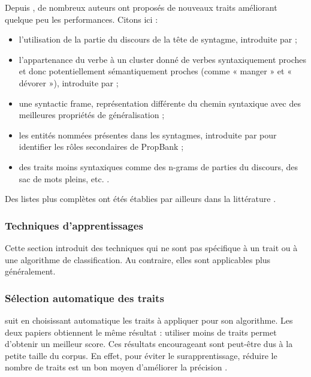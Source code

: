 Depuis \cite{gildea2002automatic}, de nombreux auteurs ont proposés de nouveaux
traits améliorant quelque peu les performances. Citons ici :

\begin{itemize}

    \item l'utilisation de la partie du discours de la tête de syntagme,
        introduite par \cite{surdeanu2003using} ;

    \item l'appartenance du verbe à un cluster donné de verbes syntaxiquement
        proches et donc potentiellement sémantiquement proches (comme « manger
        » et « dévorer »), introduite par \cite{pradhan2004shallow} ;

    \item une {syntactic frame}, représentation différente du chemin syntaxique
        avec des meilleures propriétés de généralisation
        \citep{xue2004calibrating} ;

    \item les entités nommées présentes dans les syntagmes, introduite par
        \cite{pradhan2005semantic} pour identifier les rôles secondaires de
        PropBank ;

    \item des traits moins syntaxiques comme des n-grams de parties du
        discours, des sac de mots pleins, etc. \citep{surdeanu2007combination}.

\end{itemize}

Des listes plus complètes ont étés établies par ailleurs dans la littérature
\citep{pradhan2005semantic,marquez2008semantic,palmer2010semantic}.

\subsubsection{Techniques d'apprentissages}

Cette section introduit des techniques qui ne sont pas spécifique à un trait ou
à une algorithme de classification. Au contraire, elles sont applicables plus
généralement.

\subsubsection{Sélection automatique des traits}

\cite{dinu2007sometimes} suit \cite{mihalcea2002instance} en choisissant
automatique les traits à appliquer pour son algorithme. Les deux papiers
obtiennent le même résultat : utiliser moins de traits permet d'obtenir un
meilleur score. Ces résultats encourageant sont peut-être dus à la petite
taille du corpus. En effet, pour éviter le surapprentissage, réduire le nombre
de traits est un bon moyen d'améliorer la précision \citep{van2004bias}.

